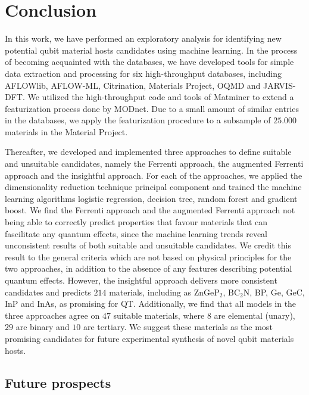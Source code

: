 \chapter*{Conclusion}

In this work, we have performed an exploratory analysis for identifying new potential qubit material hosts candidates using machine learning. In the process of becoming acquainted with the databases, we have developed tools for simple data extraction and processing for six high-throughput databases, including AFLOWlib, AFLOW-ML, Citrination, Materials Project, OQMD and JARVIS-DFT. We utilized the high-throughput code and tools of Matminer to extend a featurization process done by MODnet. Due to a small amount of similar entries in the databases, we apply the featurization procedure to a subsample of $25.000$ materials in the Material Project.

Thereafter, we developed and implemented three approaches to define suitable and unsuitable candidates, namely the Ferrenti approach, the augmented Ferrenti approach and the insightful approach. For each of the approaches, we applied the dimensionality reduction technique principal component and trained the machine learning algorithms logistic regression, decision tree, random forest and gradient boost. We find the Ferrenti approach and the augmented Ferrenti approach not being able to correctly predict properties that favour materials that can fascilitate any quantum effects, since the machine learning trends reveal unconsistent results of both suitable and unsuitable candidates. We credit this result to the general criteria which are not based on physical principles for the two approaches, in addition to the absence of any features describing potential quantum effects. However, the insightful approach delivers more consistent candidates and predicts $214$ materials, including as ZnGeP$_2$, BC$_2$N, BP, Ge, GeC, InP and InAs, as promising for QT. Additionally, we find that all models in the three approaches agree on $47$ suitable materials, where $8$ are elemental (unary), $29$ are binary and $10$ are tertiary. We suggest these materials as the most promising candidates for future experimental synthesis of novel qubit materials hosts. %
\clearpage
\section*{Future prospects}

